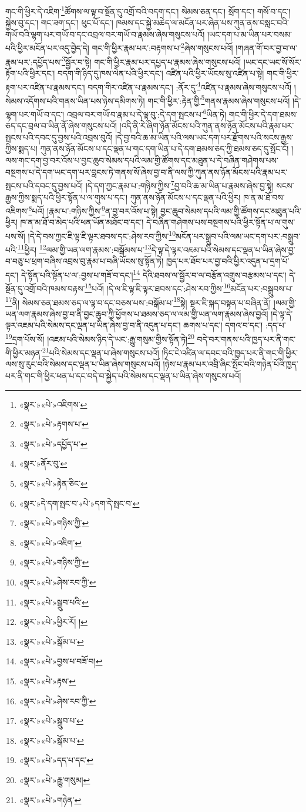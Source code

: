 གང་གི་ཕྱིར་དེ་འཇིག་\footnote{«སྣར་»«པེ་»འཇིགས་}ཚོགས་ལ་ལྟ་བ་སྔོན་དུ་འགྲོ་བའི་བདག་དང་། སེམས་ཅན་དང་། སྲོག་དང་། གསོ་བ་དང་། སྐྱེས་བུ་དང་། གང་ཟག་དང་། ཕུང་པོ་དང་། ཁམས་དང་སྐྱེ་མཆེད་ལ་མངོན་པར་ཞེན་པས་ཀུན་ནས་བསླང་བའི་གཡོ་བའི་ལྷག་པར་གཡོ་བ་དང་འབྲལ་བར་གཡོ་བ་རྣམས་ཞེས་གསུངས་པའོ། །ཡང་དག་པ་མ་ཡིན་པར་བསམ་པའི་ཕྱིར་མངོན་པར་འདུ་བྱེད་དེ། གང་གི་ཕྱིར་རྣམ་པར་:བརྟགས་པ་\footnote{«སྣར་»«པེ་»རྟགས་པ་}ཞེས་གསུངས་པའོ། །གཞན་གོ་བར་བྱ་བ་ལ་རྣམ་པར་:དཔྱོད་པས་\footnote{«སྣར་»«པེ་»དཔྱོད་པ་}སྦྱོར་བ་སྟེ། གང་གི་ཕྱིར་རྣམ་པར་དཔྱད་པ་རྣམས་ཞེས་གསུངས་པའོ། །ཡང་དང་ཡང་སོ་སོར་རྟོག་པའི་ཕྱིར་དང་། བདག་གི་ཉིད་དུ་ཁས་ལེན་པའི་ཕྱིར་དང་། འཛིན་པའི་ཕྱིར་ཡོངས་སུ་འཛིན་པ་སྟེ། གང་གི་ཕྱིར་རྟག་པར་འཛིན་པ་རྣམས་དང་། བདག་གིར་འཛིན་པ་རྣམས་དང་། :ནོར་དུ་\footnote{«སྣར་»ནོར་བུ་}འཛིན་པ་རྣམས་ཞེས་གསུངས་པའོ། །སེམས་འདོགས་པའི་གནས་ཡིན་པས་ཉེས་དམིགས་ཏེ། གང་གི་ཕྱིར་:རྟེན་གྱི་\footnote{«སྣར་»«པེ་»རྟེན་ཅིང་}གནས་རྣམས་ཞེས་གསུངས་པའོ། །དེ་ལྷག་པར་གཡོ་བ་དང་། འབྲལ་བར་གཡོ་བ་རྣམ་པ་དེ་ལྟ་བུ་:དེ་དག་སྤངས་པ་\footnote{«སྣར་»དེ་དག་སྤང་བ་«པེ་»དག་དེ་སྤང་བ་}ཡིན་ཏེ། གང་གི་ཕྱིར་དེ་དག་ཐམས་ཅད་དང་བྲལ་བ་ཡིན་ནོ་ཞེས་གསུངས་པའོ། །འདི་ནི་རེ་ཞིག་ཉོན་མོངས་པའི་ཀུན་ནས་ཉོན་མོངས་པའི་རྣམ་པར་སྤངས་པའི་དབང་དུ་བྱས་པའི་འབྲས་བུའོ། །དེ་བྱ་བའི་ཆ་མ་ཡིན་པའི་ལས་ཡང་དག་པར་རྫོགས་པའི་སངས་རྒྱས་ཀྱིས་སྨད་པ། ཀུན་ནས་ཉོན་མོངས་པ་དང་ལྡན་པ་གང་དག་ཡིན་པ་དེ་དག་ཐམས་ཅད་ཀྱི་ཐམས་ཅད་དུ་སྤོང་ངོ། །ལས་གང་དག་བྱ་བར་འོས་པ་བྱང་ཆུབ་སེམས་དཔའི་ལམ་གྱི་ཚོགས་དང་མཐུན་པ་དེ་བཞིན་གཤེགས་པས་བསྔགས་པ་དེ་དག་ཡང་དག་པར་བླངས་ཏེ་གནས་སོ་ཞེས་བྱ་བ་ནི་ལས་ཀྱི་ཀུན་ནས་ཉོན་མོངས་པའི་རྣམ་པར་སྤངས་པའི་དབང་དུ་བྱས་པའོ། །དེ་དག་ཀྱང་རྣམ་པ་:གཉིས་ཀྱིས་\footnote{«སྣར་»«པེ་»གཉིས་ཀྱི་}བྱ་བའི་ཆ་མ་ཡིན་པ་རྣམས་ཞེས་བྱ་སྟེ། སངས་རྒྱས་ཀྱིས་སྨད་པའི་ཕྱིར་སྟོན་པ་ལ་གུས་པ་དང་། ཀུན་ནས་ཉོན་མོངས་པ་དང་ལྡན་པའི་ཕྱིར། ཁ་ན་མ་ཐོ་བས་འཇིགས་\footnote{«སྣར་»«པེ་»འཇིག་}པའོ། །རྣམ་པ་:གཉིས་ཀྱིས་\footnote{«སྣར་»«པེ་»གཉིས་ཀྱི་}ན་བྱ་བར་འོས་པ་སྟེ། བྱང་ཆུབ་སེམས་དཔའི་ལམ་གྱི་ཚོགས་དང་མཐུན་པའི་ཕྱིར། ཁ་ན་མ་ཐོ་བ་མེད་པའི་ཕན་ཡོན་མཐོང་བ་དང་། དེ་བཞིན་གཤེགས་པས་བསྔགས་པའི་ཕྱིར་སྟོན་པ་ལ་གུས་པས་སོ། །དེ་དེ་བས་ཀྱང་ཇི་ལྟ་ཇི་ལྟར་ཐབས་དང་:ཤེས་རབ་ཀྱིས་\footnote{«སྣར་»«པེ་»ཤེས་རབ་ཀྱི་}མངོན་པར་སྒྲུབ་པའི་ལམ་ཡང་དག་པར་:བསྒྲུབ་པའི་\footnote{«སྣར་»«པེ་»སྒྲུབ་པའི་}ཕྱིར། \footnote{«སྣར་»«པེ་»ཕྱིར་རོ། ། }ལམ་གྱི་ཡན་ལག་རྣམས་:བསྒོམས་པ་\footnote{«སྣར་»«པེ་»སྒོམ་པ་}དེ་ལྟ་དེ་ལྟར་འཇམ་པའི་སེམས་དང་ལྡན་པ་ཡིན་ཞེས་བྱ་བ་བཅུ་པ་ཕྲག་བཞིས་འབྲས་བུ་རྣམ་པ་བཞི་ཡོངས་སུ་སྟོན་ཏེ། ཁྱད་པར་ཐོབ་པར་བྱ་བའི་ཕྱིར་འདུན་པ་དྲག་པོ་དང་། དེ་སྟོན་པའི་སྟོན་པ་ལ་:བྱས་པ་གཟོ་བ་དང་།\footnote{«སྣར་»«པེ་»བྱས་པ་བཟོ་བ།} དེའི་ཐབས་ལ་སྦྱོར་བ་ལ་བརྩོན་འགྲུས་བརྩམས་པ་དང་། དེ་སྔོན་དུ་འགྲོ་བའི་ཁམས་བརྟས་\footnote{«སྣར་»«པེ་»རྟས་}པའོ། །དེ་ལ་ཇི་ལྟ་ཇི་ལྟར་ཐབས་དང་:ཤེས་རབ་ཀྱིས་\footnote{«སྣར་»«པེ་»ཤེས་རབ་ཀྱི་}མངོན་པར་:བསྒྲུབས་པ་\footnote{«སྣར་»«པེ་»སྒྲུབ་པ་}ནི། སེམས་ཅན་ཐམས་ཅད་ལ་ལྟ་བ་དང་བཅས་པས་:བསྒོམ་པ་\footnote{«སྣར་»«པེ་»སྒོམ་པ་}སྟེ། སྔར་ཇི་སྐད་བསྟན་པ་བཞིན་ནོ། །ལམ་གྱི་ཡན་ལག་རྣམས་ཞེས་བྱ་བ་ནི་བྱང་ཆུབ་ཀྱི་ཕྱོགས་པ་ཐམས་ཅད་ལ་ལམ་གྱི་ཡན་ལག་རྣམས་ཞེས་བྱའོ། །དེ་ལྟ་དེ་ལྟར་འཇམ་པའི་སེམས་དང་ལྡན་པ་ཡིན་ཞེས་བྱ་བ་ནི་འདུན་པ་དང་། ཆགས་པ་དང་། དགའ་བ་དང་། :དད་པ་\footnote{«སྣར་»«པེ་»དད་པ་དང་}དྲག་པོས་སོ། །འཇམ་པའི་སེམས་ཉིད་དེ་ཡང་:རྒྱུ་གསུམ་གྱིས་སྟོན་ཏེ།\footnote{«སྣར་»«པེ་»རྒྱུ་གསུམ།} བདེ་བར་གནས་པའི་ཁྱད་པར་ནི་གང་གི་ཕྱིར་མཉན་\footnote{«སྣར་»«པེ་»གཉེན་}པའི་སེམས་དང་ལྡན་པ་ཞེས་གསུངས་པའོ། །ཏིང་ངེ་འཛིན་ལ་དབང་བའི་ཁྱད་པར་ནི་གང་གི་ཕྱིར་ལས་སུ་རུང་བའི་སེམས་དང་ལྡན་པ་ཡིན་ཞེས་གསུངས་པའོ། །ཉེས་པ་རྣམ་པར་འབྲི་ཞིང་སྤོང་བའི་གཉེན་པོའི་ཁྱད་པར་ནི་གང་གི་ཕྱིར་ཕན་པ་དང་བདེ་བ་སྐྱེད་པའི་སེམས་དང་ལྡན་པ་ཡིན་ཞེས་གསུངས་པའོ། 